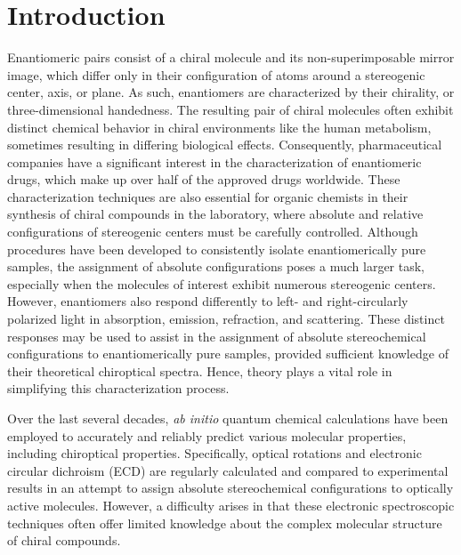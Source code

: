
\section{Introduction}
    Enantiomeric pairs consist of a chiral molecule and its non-superimposable mirror image, which differ only in their configuration of atoms around a stereogenic center, axis, or plane. As such, enantiomers are characterized by their chirality, or three-dimensional handedness. The resulting pair of chiral molecules often exhibit distinct chemical behavior in chiral environments like the human metabolism, sometimes resulting in differing biological effects\cite{Eliel1994}. Consequently, pharmaceutical companies have a significant interest in the characterization of enantiomeric drugs, which make up over half of the approved drugs worldwide\cite{Nguyen2006}. These characterization techniques are also essential for organic chemists in their synthesis of chiral compounds in the laboratory, where absolute and relative configurations of stereogenic centers must be carefully controlled. Although procedures have been developed to consistently isolate enantiomerically pure samples, the assignment of absolute configurations poses a much larger task, especially when the molecules of interest exhibit numerous stereogenic centers. However, enantiomers also respond differently to left- and right-circularly polarized light in absorption, emission, refraction, and scattering\cite{Crawford2006,Crawford2007a,Crawford2012,Barron2004,Pecul2005}. These distinct responses may be used to assist in the assignment of absolute stereochemical configurations to enantiomerically pure samples, provided sufficient knowledge of their theoretical chiroptical spectra. Hence, theory plays a vital role in simplifying this characterization process. 

    Over the last several decades, \textit{ab initio} quantum chemical calculations have been employed to accurately and reliably predict various molecular properties, including chiroptical properties\cite{Crawford2012,Crawford2007a,Crawford2006,Pedersen1999}. Specifically, optical rotations and electronic circular dichroism (ECD) are regularly calculated and compared to experimental results in an attempt to assign absolute stereochemical configurations to optically active molecules. However, a difficulty arises in that these electronic spectroscopic techniques often offer limited knowledge about the complex molecular structure of chiral compounds. 

